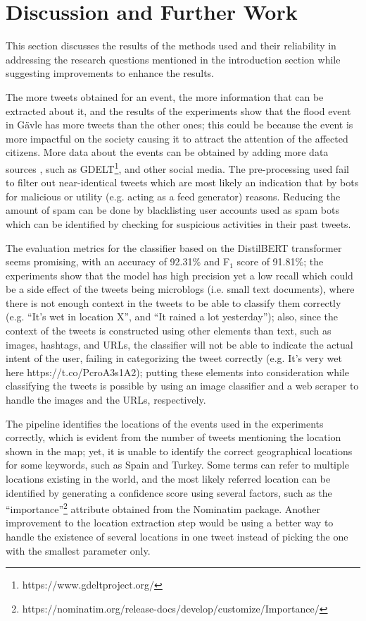 \chapter{Discussion and Further Work}\label{sec:discussion_and_further_work}
This section discusses the results of the methods used and their reliability in addressing the
research questions mentioned in the introduction section while suggesting improvements to enhance
the results.

The more tweets obtained for an event, the more information that can be extracted about it, and the
results of the experiments show that the flood event in Gävle has more tweets than the other ones;
this could be because the event is more impactful on the society causing it to attract the attention
of the affected citizens. More data about the events can be obtained by adding more data sources
, such as \ac{GDELT}\footnote{https://www.gdeltproject.org/}, and other social media. The
pre-processing used fail to filter out near-identical tweets which are most likely an indication
that by bots for malicious or utility (e.g. acting as a feed generator) reasons. Reducing the amount
of spam can be done by blacklisting user accounts used as spam bots which can be identified by
checking for suspicious activities in their past tweets.

The evaluation metrics for the classifier based on the DistilBERT transformer seems promising, with
an accuracy of 92.31\% and F$_{1}$ score of 91.81\%; the experiments show that the model has high
precision yet a low recall which could be a side effect of the tweets being microblogs (i.e. small
text documents), where there is not enough context in the tweets to be able to classify them correctly
(e.g. ``It's wet in location X'', and ``It rained a lot yesterday''); also, since the context of the
tweets is constructed using other elements than text, such as images, hashtags, and \ac{URL}s, the
classifier will not be able to indicate the actual intent of the user, failing in categorizing the
tweet correctly (e.g. It's very wet here https://t.co/PcroA3s1A2); putting
these elements into consideration while classifying the tweets is possible by using an image
classifier and a web scraper to handle the images and the \ac{URL}s, respectively.

The pipeline identifies the locations of the events used in the experiments correctly, which is
evident from the number of tweets mentioning the location shown in the map; yet, it is unable to
identify the correct geographical locations for some keywords, such as Spain and Turkey. Some terms
can refer to multiple locations existing in the world, and the most likely referred location can be
identified by generating a confidence score using several factors, such as the
``importance''\footnote{https://nominatim.org/release-docs/develop/customize/Importance/} attribute
obtained from the Nominatim package. Another improvement to the location extraction step would be
using a better way to handle the existence of several locations in one tweet instead of picking the
one with the smallest parameter only.

